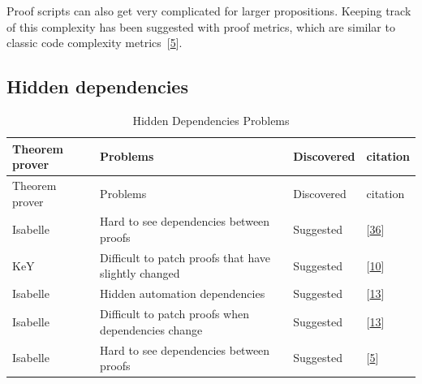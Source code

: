 \documentclass[
]{article}
\begin{document}
Proof scripts can also get very complicated for larger propositions.
Keeping track of this complexity has been suggested with proof metrics,
which are similar to classic code complexity
metrics~{[}\protect\hyperlink{ref-aspinall_towards_2016}{5}{]}.

\hypertarget{hidden-dependencies-1}{%
\subsection{Hidden dependencies}\label{hidden-dependencies-1}}

\hypertarget{tbl:hidden_dependencies}{}
\begin{longtable}[]{@{}llll@{}}
\caption{\label{tbl:hidden_dependencies}Hidden Dependencies
Problems}\tabularnewline
\toprule
Theorem prover & Problems & Discovered & citation \\
\midrule
\endfirsthead
\toprule
Theorem prover & Problems & Discovered & citation \\
\midrule
\endhead
Isabelle & Hard to see dependencies between proofs & Suggested &
{[}\protect\hyperlink{ref-spichkova_human-centred_2017}{36}{]} \\
KeY & Difficult to patch proofs that have slightly changed & Suggested &
{[}\protect\hyperlink{ref-beckert_evaluating_2012}{10}{]} \\
Isabelle & Hidden automation dependencies & Suggested &
{[}\protect\hyperlink{ref-bourke_challenges_2012}{13}{]} \\
Isabelle & Difficult to patch proofs when dependencies change &
Suggested & {[}\protect\hyperlink{ref-bourke_challenges_2012}{13}{]} \\
Isabelle & Hard to see dependencies between proofs & Suggested &
{[}\protect\hyperlink{ref-aspinall_towards_2016}{5}{]} \\
\bottomrule
\end{longtable}
\end{document}

